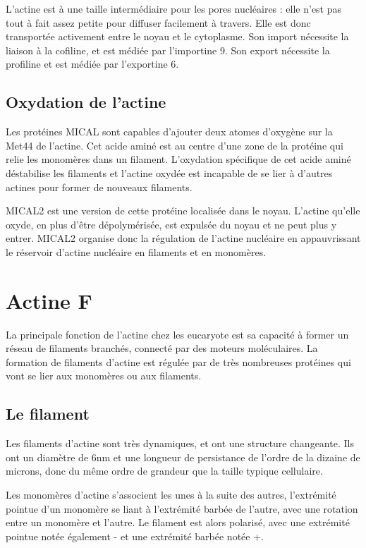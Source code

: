 \documentclass{report}
\begin{document}
L'actine est à une taille intermédiaire pour les pores nucléaires : elle n'est pas tout à fait assez petite pour diffuser facilement à travers. Elle est donc transportée activement entre le noyau et le cytoplasme. 
Son import nécessite la liaison à la cofiline, et est médiée par l'importine 9. Son export nécessite la profiline et est médiée par l'exportine 6. 



\subsection{Oxydation de l'actine}

Les protéines MICAL sont capables d'ajouter deux atomes d'oxygène sur la Met44 de l'actine. Cet acide aminé est au centre d'une zone de la protéine qui relie les monomères dans un filament. 
L'oxydation spécifique de cet acide aminé déstabilise les filaments et l'actine oxydée est incapable de se lier à d'autres actines pour former de nouveaux filaments. 

MICAL2 est une version de cette protéine localisée dans le noyau. L'actine qu'elle oxyde, en plus d'être dépolymérisée, est expulsée du noyau et ne peut plus y entrer. MICAL2 organise donc la régulation de l'actine nucléaire en appauvrissant le réservoir d'actine nucléaire en filaments et en monomères. 




\section{Actine F}

La principale fonction de l'actine chez les eucaryote est sa capacité à former un réseau de filaments branchés, connecté par des moteurs moléculaires. 
La formation de filaments d'actine est régulée par de très nombreuses protéines qui vont se lier aux monomères ou aux filaments. 

\subsection{Le filament}

Les filaments d'actine sont très dynamiques, et ont une structure changeante. Ils ont un diamètre de 6nm et une longueur de persistance de l'ordre de la dizaine de microns, donc du même ordre de grandeur que la taille typique cellulaire. 

Les monomères d'actine s'associent les unes à la suite des autres, l'extrémité pointue d'un monomère se liant à l'extrémité barbée de l'autre, avec une rotation entre un monomère et l'autre. 
Le filament est alors polarisé, avec une extrémité pointue notée également - et une extrémité barbée notée +. 
\end{document}
